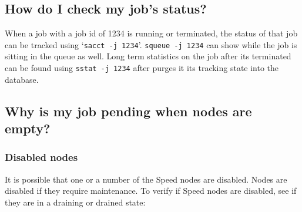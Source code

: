 \subsection{How do I check my job's status?}

When a job with a job id of 1234 is running or terminated, the status of that job can be tracked using `\verb!sacct -j 1234!'.
\texttt{squeue -j 1234} can show while the job is sitting in the queue as well.
Long term statistics on the job after its terminated can be found using
\texttt{sstat -j 1234} after  purges it its tracking state
into the database.

\subsection{Why is my job pending when nodes are empty?}

\subsubsection{Disabled nodes}

It is possible that one or a number of the Speed nodes are disabled. Nodes are disabled if they require maintenance. 
To verify if Speed nodes are disabled, see if they are in a draining or drained state:


